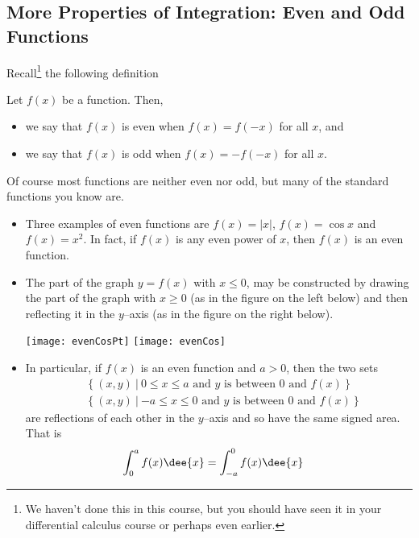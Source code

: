 \subsection{More Properties of Integration: Even and Odd Functions}
\label{sec:evenodd}
Recall\footnote{We haven't done this in this course, but you should have seen
it in your differential calculus course or perhaps even earlier.} the following
definition
\begin{defn}\label{def:INTevenodd}
  Let $f(x)$ be a function. Then,
 \begin{itemize}
  \item we say that $f(x)$ is even when $f(x)=f(-x)$ for all $x$, and
  \item we say that $f(x)$ is odd when $f(x)=-f(-x)$ for all $x$.
 \end{itemize}
\end{defn}
Of course most functions are neither even nor odd, but many of the standard
functions you know are.
\begin{eg}\label{eg:lefthalfevenfunction}
\begin{itemize}
   \item Three examples of even functions are $f(x)=|x|$, $f(x)=\cos x$ and
  $f(x)=x^2$. In fact, if $f(x)$ is any even power of $x$, then $f(x)$ is an
even function.
   \item The part of the graph $y=f(x)$ with $x\le 0$, may be constructed by
         drawing the part of the graph with $x\ge 0$ (as in the figure
         on the left below) and then reflecting it in the $y$--axis
         (as in the figure on the right below).
        \begin{efig}
        \begin{center}
            \texttt{[image: evenCosPt]}\qquad
            \texttt{[image: evenCos]}
         \end{center}
         \end{efig}
  \item In particular, if $f(x)$ is an even function and $a>0$, then
      the two sets
   \begin{align*}
     &\big\{\ (x,y)\ \big|\
       \text{$0\le x\le a$ and $y$ is between $0$ and $f(x)$} \ \big\} \\
     &\big\{\ (x,y)\ \big|\
       \text{$-a\le x\le 0$ and $y$ is between $0$ and $f(x)$} \ \big\}
    \end{align*}
   are reflections of each other in the $y$--axis and so have the same
   signed area. That is
  \begin{align*}
        \int_0^a f(x)\dee{x} &= \int_{-a}^0 f(x)\dee{x}
  \end{align*}
   \end{itemize}
\end{eg}
